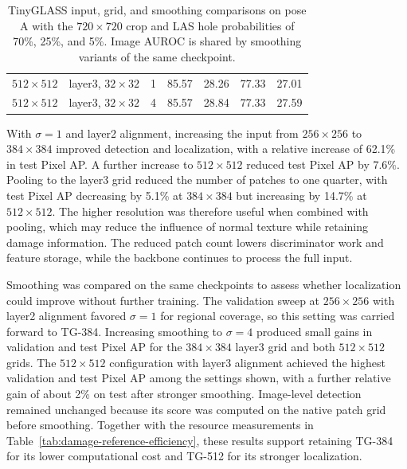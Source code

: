 \begin{table}[ht!]
\begin{tabular}{@{}c c c c c c c@{}}
        \(512\times512\) & layer3, \(32\times32\)    & 1                   & 85.57                                           & 28.26                                        & 77.33                                            & 27.01                                         \\
        \(512\times512\) & layer3, \(32\times32\)    & 4                   & 85.57                                           & 28.84                                        & 77.33                                            & 27.59                                         \\
        \bottomrule
    \end{tabular}
    \vspace{5mm}
    \caption{TinyGLASS input, grid, and smoothing comparisons on pose A with the \(720\times720\) crop and LAS hole probabilities of 70\%, 25\%, and 5\%. Image AUROC is shared by smoothing variants of the same checkpoint.}
    \label{tab:damage-tinyglass-spatial-ablation}
\end{table}

With \(\sigma=1\) and layer2 alignment, increasing the input from \(256\times256\) to \(384\times384\) improved detection and localization, with a relative increase of 62.1\% in test Pixel AP. A further increase to \(512\times512\) reduced test Pixel AP by 7.6\%. Pooling to the layer3 grid reduced the number of patches to one quarter, with test Pixel AP decreasing by 5.1\% at \(384\times384\) but increasing by 14.7\% at \(512\times512\). The higher resolution was therefore useful when combined with pooling, which may reduce the influence of normal texture while retaining damage information. The reduced patch count lowers discriminator work and feature storage, while the backbone continues to process the full input.

Smoothing was compared on the same checkpoints to assess whether localization could improve without further training. The validation sweep at \(256\times256\) with layer2 alignment favored \(\sigma=1\) for regional coverage, so this setting was carried forward to TG-384. Increasing smoothing to \(\sigma=4\) produced small gains in validation and test Pixel AP for the \(384\times384\) layer3 grid and both \(512\times512\) grids. The \(512\times512\) configuration with layer3 alignment achieved the highest validation and test Pixel AP among the settings shown, with a further relative gain of about 2\% on test after stronger smoothing. Image-level detection remained unchanged because its score was computed on the native patch grid before smoothing. Together with the resource measurements in Table~\ref{tab:damage-reference-efficiency}, these results support retaining TG-384 for its lower computational cost and TG-512 for its stronger localization.
